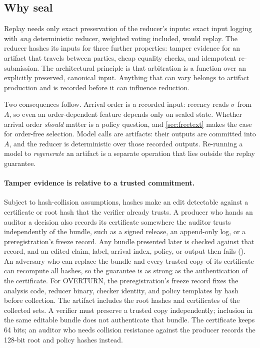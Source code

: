 \subsection{Why seal}
\label{sec:why-seal}

Replay needs only exact preservation of the reducer's inputs: exact input logging with \emph{any} deterministic reducer, weighted voting included, would replay. The reducer hashes its inputs for three further properties: tamper evidence for an artifact that travels between parties, cheap equality checks, and idempotent re-submission. The architectural principle is that arbitration is a function over an explicitly preserved, canonical input. Anything that can vary belongs to artifact production and is recorded before it can influence reduction.

Two consequences follow. Arrival order is a recorded input: recency reads $\sigma$ from $A$, so even an order-dependent feature depends only on sealed state. Whether arrival order \emph{should} matter is a policy question, and \cref{sec:freetext} makes the case for order-free selection. Model calls are artifacts: their outputs are committed into $A$, and the reducer is deterministic over those recorded outputs. Re-running a model to \emph{regenerate} an artifact is a separate operation that lies outside the replay guarantee.

\paragraph{Tamper evidence is relative to a trusted commitment.} Subject to hash-collision assumptions, hashes make an edit detectable against a certificate or root hash that the verifier already trusts. A producer who hands an auditor a decision also records its certificate somewhere the auditor trusts independently of the bundle, such as a signed release, an append-only log, or a preregistration's freeze record. Any bundle presented later is checked against that record, and an edited claim, label, arrival index, policy, or output then fails (). An adversary who can replace the bundle and every trusted copy of its certificate can recompute all hashes, so the guarantee is as strong as the authentication of the certificate. For OVERTURN, the preregistration's freeze record fixes the analysis code, reducer binary, checker identity, and policy templates by hash before collection. The artifact includes the root hashes and certificates of the collected sets. A verifier must preserve a trusted copy independently; inclusion in the same editable bundle does not authenticate that bundle. The certificate keeps 64 bits; an auditor who needs collision resistance against the producer records the 128-bit root and policy hashes instead.
